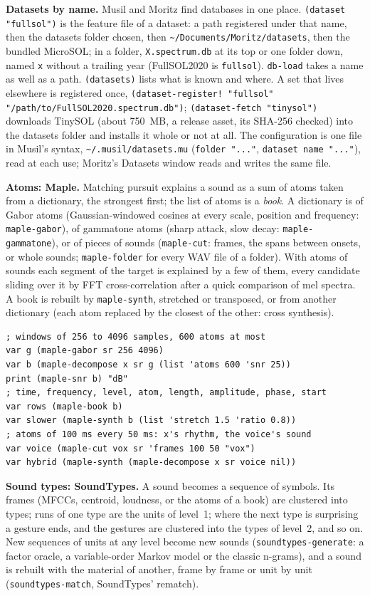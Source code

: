 \documentclass[11pt,a4paper]{article}
\newcommand{\musil}[1]{\lstinline[style=musilinline]{#1}}
\begin{document}
\textbf{Datasets by name.} Musil and Moritz find databases in one place. \musil{(dataset "fullsol")}
is the feature file of a dataset: a path registered under that name, then the datasets folder
chosen, then \texttt{\textasciitilde/Documents/Moritz/datasets}, then the bundled MicroSOL; in a folder,
\texttt{X.spectrum.db} at its top or one folder down, named \texttt{x} without a trailing year
(FullSOL2020 is \texttt{fullsol}). \musil{db-load} takes a name as well as a path. \musil{(datasets)}
lists what is known and where. A set that lives elsewhere is registered once,
\musil{(dataset-register! "fullsol" "/path/to/FullSOL2020.spectrum.db")}; \musil{(dataset-fetch "tinysol")}
downloads TinySOL (about 750~MB, a release asset, its SHA-256 checked) into the datasets folder
and installs it whole or not at all. The configuration is one file in Musil's syntax,
\texttt{\textasciitilde/.musil/datasets.mu} (\texttt{folder "..."}, \texttt{dataset name "..."}),
read at each use; Moritz's Datasets window reads and writes the same file.

\textbf{Atoms: Maple.} Matching pursuit explains a sound as a sum of atoms taken from a
dictionary, the strongest first; the list of atoms is a \emph{book}. A dictionary is of
Gabor atoms (Gaussian-windowed cosines at every scale, position and frequency:
\musil{maple-gabor}), of gammatone atoms (sharp attack, slow decay: \musil{maple-gammatone}),
or of pieces of sounds (\musil{maple-cut}: frames, the spans between onsets, or whole
sounds; \musil{maple-folder} for every WAV file of a folder). With atoms of sounds each
segment of the target is explained by a few of them, every candidate sliding over it by
FFT cross-correlation after a quick comparison of mel spectra. A book is rebuilt by
\musil{maple-synth}, stretched or transposed, or from another dictionary (each atom
replaced by the closest of the other: cross synthesis).

\begin{lstlisting}
; windows of 256 to 4096 samples, 600 atoms at most
var g (maple-gabor sr 256 4096)
var b (maple-decompose x sr g (list 'atoms 600 'snr 25))
print (maple-snr b) "dB"
; time, frequency, level, atom, length, amplitude, phase, start
var rows (maple-book b)
var slower (maple-synth b (list 'stretch 1.5 'ratio 0.8))
; atoms of 100 ms every 50 ms: x's rhythm, the voice's sound
var voice (maple-cut vox sr 'frames 100 50 "vox")
var hybrid (maple-synth (maple-decompose x sr voice nil))
\end{lstlisting}

\textbf{Sound types: SoundTypes.} A sound becomes a sequence of symbols. Its frames (MFCCs,
centroid, loudness, or the atoms of a book) are clustered into types; runs of one type are
the units of level~1; where the next type is surprising a gesture ends, and the gestures are
clustered into the types of level~2, and so on. New sequences of units at any level become
new sounds (\musil{soundtypes-generate}: a factor oracle, a variable-order Markov model or
the classic n-grams), and a sound is rebuilt with the material of another, frame by frame or
unit by unit (\musil{soundtypes-match}, SoundTypes' rematch).
\end{document}

